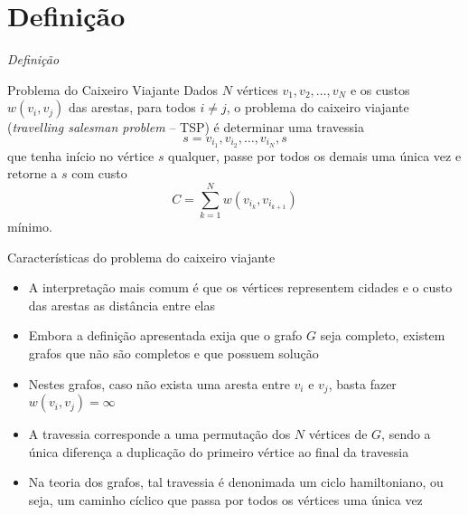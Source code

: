 \section{Definição}

\begin{frame}[fragile]{{\it Definição}}

    \begin{block}{Problema do Caixeiro Viajante}
        Dados $N$ vértices $v_1, v_2, \ldots, v_N$ e os custos $w(v_i, v_j)$ das arestas, para 
        todos $i\neq j$, o problema do caixeiro viajante (\textit{travelling salesman problem} --
        TSP) é determinar uma travessia
        \[
            s = v_{i_1}, v_{i_2}, \ldots, v_{i_N}, s
        \]
        que tenha início no vértice $s$ qualquer, passe por todos os demais uma única vez e retorne
        a $s$ com custo 
        \[
            C = \sum_{k = 1}^N w(v_{i_k}, v_{i_{k + 1}})
        \]
        mínimo.
    \end{block}

\end{frame}

\begin{frame}[fragile]{Características do problema do caixeiro viajante}

    \begin{itemize}
        \item A interpretação mais comum é que os vértices representem cidades e o custo das
            arestas as distância entre elas

        \item Embora a definição apresentada exija que o grafo $G$ seja completo, existem
            grafos que não são completos e que possuem solução

        \item Nestes grafos, caso não exista uma aresta entre $v_i$ e $v_j$, basta fazer 
            $w(v_i, v_j) = \infty$

        \item A travessia corresponde a uma permutação dos $N$ vértices de $G$, sendo a única
            diferença a duplicação do primeiro vértice ao final da travessia

        \item Na teoria dos grafos, tal travessia é denonimada um ciclo hamiltoniano, ou seja,
            um caminho cíclico que passa por todos os vértices uma única vez

    \end{itemize}

\end{frame}
